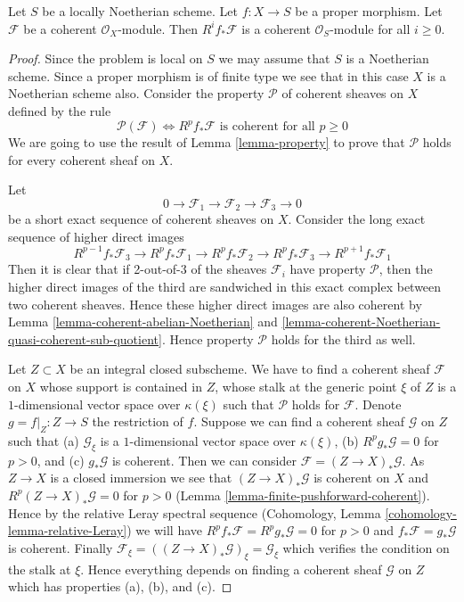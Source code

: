 \begin{proposition}
\label{proposition-proper-pushforward-coherent}
Let $S$ be a locally Noetherian scheme.
Let $f : X \to S$ be a proper morphism.
Let $\mathcal{F}$ be a coherent $\mathcal{O}_X$-module.
Then $R^if_*\mathcal{F}$ is a coherent $\mathcal{O}_S$-module
for all $i \geq 0$.
\end{proposition}

\begin{proof}
Since the problem is local on $S$ we may assume that $S$ is
a Noetherian scheme. Since a proper morphism is of finite type
we see that in this case $X$ is a Noetherian scheme also.
Consider the property $\mathcal{P}$ of coherent sheaves
on $X$ defined by the rule
$$
\mathcal{P}(\mathcal{F}) \Leftrightarrow
R^pf_*\mathcal{F}\text{ is coherent for all }p \geq 0
$$
We are going to use the result of
Lemma \ref{lemma-property} to prove that
$\mathcal{P}$ holds for every coherent sheaf on $X$.

\medskip\noindent
Let
$$
0 \to \mathcal{F}_1 \to \mathcal{F}_2 \to \mathcal{F}_3 \to 0
$$
be a short exact sequence of coherent sheaves on $X$.
Consider the long exact sequence of higher direct images
$$
R^{p - 1}f_*\mathcal{F}_3 \to
R^pf_*\mathcal{F}_1 \to
R^pf_*\mathcal{F}_2 \to
R^pf_*\mathcal{F}_3 \to
R^{p + 1}f_*\mathcal{F}_1
$$
Then it is clear that if 2-out-of-3 of the sheaves $\mathcal{F}_i$
have property $\mathcal{P}$, then the higher direct images of the
third are sandwiched in this exact complex between two coherent
sheaves. Hence these higher direct images are also coherent by
Lemma \ref{lemma-coherent-abelian-Noetherian} and
\ref{lemma-coherent-Noetherian-quasi-coherent-sub-quotient}.
Hence property $\mathcal{P}$ holds for the third as well.

\medskip\noindent
Let $Z \subset X$ be an integral closed subscheme.
We have to find a coherent sheaf $\mathcal{F}$ on $X$ whose support is
contained in $Z$, whose stalk at the generic point $\xi$ of $Z$ is a
$1$-dimensional vector space over $\kappa(\xi)$ such that $\mathcal{P}$
holds for $\mathcal{F}$. Denote $g = f|_Z : Z \to S$ the restriction of $f$.
Suppose we can find a coherent sheaf $\mathcal{G}$ on $Z$ such
that
(a) $\mathcal{G}_\xi$ is a $1$-dimensional vector space over $\kappa(\xi)$,
(b) $R^pg_*\mathcal{G} = 0$ for $p > 0$, and
(c) $g_*\mathcal{G}$ is coherent. Then we can consider
$\mathcal{F} = (Z \to X)_*\mathcal{G}$. As $Z \to X$ is a closed immersion
we see that $(Z \to X)_*\mathcal{G}$ is coherent on $X$
and $R^p(Z \to X)_*\mathcal{G} = 0$ for $p > 0$
(Lemma \ref{lemma-finite-pushforward-coherent}).
Hence by the relative Leray spectral sequence
(Cohomology, Lemma \ref{cohomology-lemma-relative-Leray})
we will have $R^pf_*\mathcal{F} = R^pg_*\mathcal{G} = 0$ for $p > 0$
and $f_*\mathcal{F} = g_*\mathcal{G}$ is coherent.
Finally $\mathcal{F}_\xi = ((Z \to X)_*\mathcal{G})_\xi = \mathcal{G}_\xi$
which verifies the condition on the stalk at $\xi$.
Hence everything depends on finding a coherent sheaf $\mathcal{G}$
on $Z$ which has properties (a), (b), and (c).


\end{proof}
